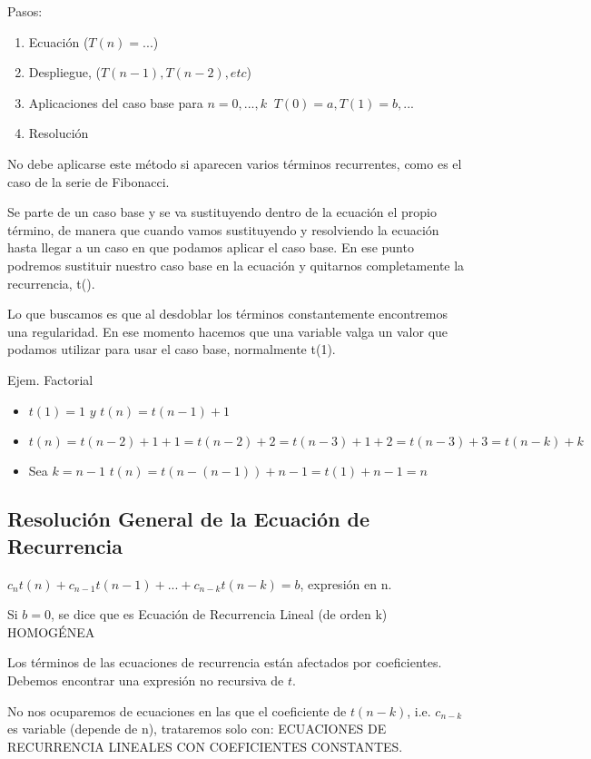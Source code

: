 Pasos:
\begin{enumerate}
  \item Ecuación ($T(n)=...$)
  \item Despliegue, ($T(n-1), T(n-2), etc$)
  \item Aplicaciones del caso base para $n=0, ..., k\;\; T(0)=a, T(1)=b, ...$
  \item Resolución
\end{enumerate}

No debe aplicarse este método si aparecen varios términos recurrentes, como es el caso de la serie de Fibonacci.

Se parte de un caso base y se va sustituyendo dentro de la ecuación el propio término, de manera que cuando vamos sustituyendo y resolviendo la ecuación hasta llegar a un caso en que podamos aplicar el caso base. En ese punto podremos sustituir nuestro caso base en la ecuación y quitarnos completamente la recurrencia, t().

Lo que buscamos es que al desdoblar los términos constantemente encontremos una regularidad. En ese momento hacemos que una variable valga un valor que podamos utilizar para usar el caso base, normalmente t(1).

Ejem. Factorial
\begin{itemize}
  \item $t(1) = 1 \textit{ y } t(n) = t(n-1)+1$
  \item $t(n) = t(n-2)+1+1=t(n-2)+2=t(n-3)+1+2=t(n-3)+3=t(n-k)+k$
  \item Sea $k=n-1$ $t(n)=t(n-(n-1))+n-1=t(1)+n-1=n$
\end{itemize}

\subsection{Resolución General de la Ecuación de Recurrencia}
$c_nt(n)+c_{n-1}t(n-1)+...+c_{n-k}t(n-k)=b$, expresión en n.

Si $b=0$, se dice que es Ecuación de Recurrencia Lineal (de orden k) HOMOGÉNEA

Los términos de las ecuaciones de recurrencia están afectados por coeficientes. Debemos encontrar una expresión no recursiva de $t$.

No nos ocuparemos de ecuaciones en las que el coeficiente de $t(n-k)$, i.e. $c_{n-k}$ es variable (depende de n), trataremos solo con: ECUACIONES DE RECURRENCIA LINEALES CON COEFICIENTES CONSTANTES.

